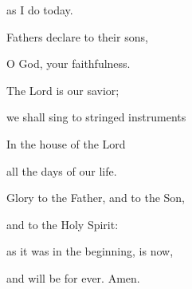 as I do today.

\noindent Fathers declare to their sons,~\GreStar{}~\nopagebreak

O God, your faithfulness.

\noindent The Lord is our savior;~\GreStar{}~\nopagebreak

we shall sing to stringed instruments

\noindent In the house of the Lord~\GreStar{}~\nopagebreak

all the days of our life.

\noindent Glory to the Father, and to the Son,~\GreStar{}~\nopagebreak

and to the Holy Spirit:

\noindent as it was in the beginning, is now,~\GreStar{}~\nopagebreak

and will be for ever. Amen.
